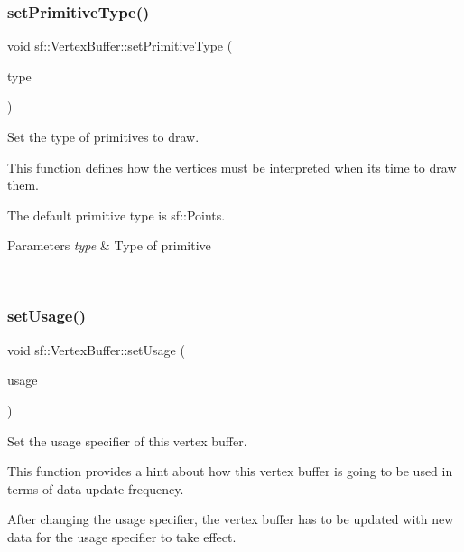 \subsubsection{\texorpdfstring{setPrimitiveType()}{setPrimitiveType()}}
{\footnotesize\ttfamily void sf\+::\+Vertex\+Buffer\+::set\+Primitive\+Type (\begin{DoxyParamCaption}\item[{\mbox{\hyperlink{group__graphics_ga5ee56ac1339984909610713096283b1b}{Primitive\+Type}}}]{type }\end{DoxyParamCaption})}



Set the type of primitives to draw. 

This function defines how the vertices must be interpreted when it\textquotesingle{}s time to draw them.

The default primitive type is sf\+::\+Points.


\begin{DoxyParams}{Parameters}
{\em type} & Type of primitive \begin{DoxyVerb}\end{DoxyVerb}
 \\
\hline
\end{DoxyParams}
\mbox{\label{classsf_1_1_vertex_buffer_ace40070db1fccf12a025383b23e81cad}} 
\subsubsection{\texorpdfstring{setUsage()}{setUsage()}}
{\footnotesize\ttfamily void sf\+::\+Vertex\+Buffer\+::set\+Usage (\begin{DoxyParamCaption}\item[{\mbox{\hyperlink{classsf_1_1_vertex_buffer_a3a531528684e63ecb45edd51282f5cb7}{Usage}}}]{usage }\end{DoxyParamCaption})}



Set the usage specifier of this vertex buffer. 

This function provides a hint about how this vertex buffer is going to be used in terms of data update frequency.

After changing the usage specifier, the vertex buffer has to be updated with new data for the usage specifier to take effect.


